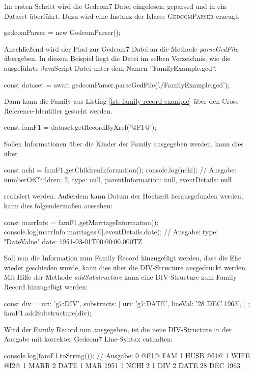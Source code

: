 \vspace{1em}
{
\noindent
Im ersten Schritt wird die Gedcom7 Datei eingelesen, geparsed und in ein Dataset überführt. Dazu wird eine Instanz der Klasse \textsc{GedcomParser} erzeugt.
\begin{javascriptNoCaption}
	gedcomParser = new GedcomParser();
\end{javascriptNoCaption}
Anschließend wird der Pfad zur Gedcom7 Datei an die Methode \textit{parseGedFile} übergeben. In diesem Beispiel liegt die Datei im selben Verzeichnis, wie die ausgeführte JavaScript-Datei unter dem Namen ''FamilyExample.ged``. 
\begin{javascriptNoCaption}
	const dataset = await gedcomParser.parseGedFile('./FamilyExample.ged');
\end{javascriptNoCaption}
Dann kann die Family aus Listing \ref{lst: family record example} über den Cross-Reference-Identifier gesucht werden.
\begin{javascriptNoCaption}
	const famF1 = dataset.getRecordByXref('@F1@');
\end{javascriptNoCaption}
Sollen Informationen über die Kinder der Family ausgegeben werden, kann dies über 
\begin{javascriptNoCaption}
	const nchi = famF1.getChildrenInformation();
	console.log(nchi);
	// Ausgabe: 
	   {
		 numberOfChildren: 2,
		 type: null,
		 parentInformation: null,
		 eventDetails: null
	   }
\end{javascriptNoCaption}
realisiert werden. Außerdem kann Datum der Hochzeit herausgefunden werden, kann dies folgendermaßen aussehen:
\begin{javascriptNoCaption}
	const marrInfo = famF1.getMarriageInformation();
	console.log(marrInfo.marriages[0].eventDetails.date);
	// Ausgabe: 
	   {
		 type: "DateValue"
		 date: 1951-03-01T00:00:00.000TZ
	   }
\end{javascriptNoCaption}
Soll nun die Information zum Family Record hinzugefügt werden, dass die Ehe wieder geschieden wurde, kann dies über die DIV-Structure ausgedrückt werden. Mit Hilfe der Methode \textit{addSubstructure} kann eine DIV-Structure zum Family Record hinzugefügt werden:
\begin{javascriptNoCaption}
	const div = {
		uri: 'g7:DIV',
		substructs: [{
			uri: 'g7:DATE',
			lineVal: '28 DEC 1963',
		}]
	};
	famF1.addSubstructure(div);
\end{javascriptNoCaption}
Wird der Family Record nun ausgegeben, ist die neue DIV-Structure in der Ausgabe mit korrekter Gedcom7 Line-Syntax enthalten:
\begin{javascriptNoCaption}
	console.log(famF1.toString());
	// Ausgabe: 
	   0 @F1@ FAM
	   1 HUSB @I1@
	   1 WIFE @I2@
	   1 MARR
	   2 DATE 1 MAR 1951
	   1 NCHI 2
	   1 DIV
	   2 DATE 28 DEC 1963
\end{javascriptNoCaption}
}

